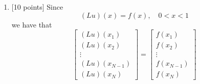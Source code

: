\begin{solution}
\begin{enumerate}
\begin{eqnarray*}
\begin{array}{ccccccccc}
\\
\vdots & \vdots & \vdots & \ddots & \ddots & \ddots & \vdots & \vdots & \vdots
\\
0 & 0 & 0 & \cdots & -\frac{1}{h^2} & \frac{2}{h^2}+9 & -\frac{1}{h^2} & 0 & 0
\\
0 & 0  & 0 & \cdots & 0 & -\frac{1}{h^2} & \frac{2}{h^2}+9 & -\frac{1}{h^2} & 0
\\
0 & 0 & 0 & \cdots & 0 & 0 & -\frac{1}{h^2} & \frac{2}{h^2}+9 & -\frac{1}{h^2}
 \end{array}\right]
\left[\begin{array}{c} u(x_0) \\ u(x_1) \\u(x_2) \\ \vdots \\ u(x_{N-1}) \\ u(x_N) \\ u(x_{N+1}) \end{array}\right]
\\
&=&\BD\left[\begin{array}{c} u(x_0) \\ u(x_1) \\u(x_2) \\ \vdots \\ u(x_{N-1}) \\ u(x_N) \\ u(x_{N+1}) \end{array}\right]
\end{eqnarray*}
where $\BD\in\R^{N\times\left(N+2\right)}$ is the matrix with entries
\[
D_{jk}=\left\{\begin{array}{rl}
\frac{2}{h^2}+9 & \mbox{if }k=j+1;
\\
-\frac{1}{h^2} & \mbox{if }k=j\mbox{ or }k=j+2;
\\
0 & \mbox{otherwise}.
\end{array}\right.
\]
\\
\item {[10 points]} Since
\[
(Lu)(x)=f(x),\quad0<x<1
\]
we have that
\[
\left[\begin{array}{c} (Lu)(x_1) \\ (Lu)(x_2) \\ \vdots \\ (Lu)(x_{N-1}) \\ (Lu)(x_N) \end{array}\right]=\left[\begin{array}{c} f(x_1) \\ f(x_2) \\ \vdots \\ f(x_{N-1}) \\ f(x_N) \end{array}\right]
\]
\end{enumerate}
\end{solution}
